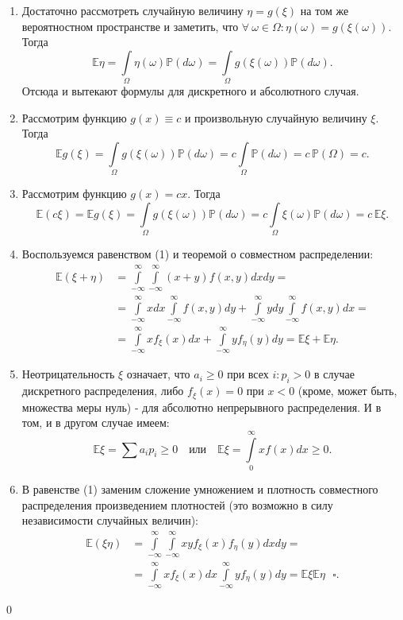 \documentclass[oneside,final,14pt]{extreport}
\newcommand\myprob[1]{{\mathbb{P}(#1)}}
\renewenvironment{proof}{{\bfseries Доказательство.}}{\qed}
\theoremstyle{plain}
\theoremstyle{definition}
\theoremstyle{named}
\begin{document}
\begin{proof}
\begin{enumerate}
    \item Достаточно рассмотреть случайную величину $\eta = g(\xi)$ на том же вероятностном пространстве и заметить, что $\forall \: \omega \in \Omega \colon \eta(\omega) = g(\xi(\omega))$. Тогда 
    $$ \mathbb{E}\eta = \int\limits_{\Omega} \eta(\omega) \mathbb{P}(d\omega) = \int\limits_{\Omega} g(\xi(\omega)) \mathbb{P}(d\omega). $$
    Отсюда и вытекают формулы для дискретного и абсолютного случая.
    
    \item Рассмотрим функцию $g(x) \equiv c$ и произвольную случайную величину $\xi$. Тогда 
    $$ \mathbb{E}g(\xi) = \int\limits_{\Omega}g(\xi(\omega))\mathbb{P}(d\omega) = 
    c \int\limits_{\Omega}\mathbb{P}(d\omega) = c \, \myprob{\Omega} = c.$$
    
    \item Рассмотрим функцию $g(x) = cx$. Тогда
    $$ \mathbb{E}(c\xi) = \mathbb{E}g(\xi) = \int\limits_{\Omega}g(\xi(\omega))\mathbb{P}(d\omega) = 
    c \int\limits_{\Omega}\xi(\omega)\mathbb{P}(d\omega) = 
    c \, \mathbb{E}\xi.$$
    
    \item Воспользуемся равенством (1) и теоремой о совместном распределении:
        $$\begin{aligned}
        \mathbb{E}(\xi+\eta) &=\int\limits_{-\infty}^{\infty} \int\limits_{-\infty}^{\infty}(x+y) f(x, y) d x d y=\\
        &=\int\limits_{-\infty}^{\infty} x d x \int\limits_{-\infty}^{\infty} f(x, y) d y+\int\limits_{-\infty}^{\infty} y d y \int\limits_{-\infty}^{\infty} f(x, y) d x=\\
        &=\int\limits_{-\infty}^{\infty} x f_{\xi}(x) d x+\int\limits_{-\infty}^{\infty} y f_{\eta}(y) d y=\mathbb{E} \xi+\mathbb{E} \eta.
        \end{aligned}$$
    \item Неотрицательность $\xi$ означает, что $a_i \geqslant 0$ при всех $i \colon p_i > 0$ в случае дискретного распределения, либо $f_\xi(x) = 0$ при $x < 0$ (кроме, может быть, множества меры нуль) - для абсолютно непрерывного распределения. И в том, и в другом случае имеем:
        $$\mathbb{E} \xi=\sum a_{i} p_{i} \geqslant 0 \quad \text {или} \quad \mathbb{E} \xi=\int\limits_{0}^{\infty} x f(x) d x \geqslant 0.$$
        
    \item В равенстве (1) заменим сложение умножением и плотность совместного распределения произведением плотностей (это возможно в силу независимости случайных величин):
        $$\begin{aligned}
        \mathbb{E}(\xi \eta) &=\int\limits_{-\infty}^{\infty} \int\limits_{-\infty}^{\infty} x y f_{\xi}(x) f_{\eta}(y) d x d y=\\
        &=\int\limits_{-\infty}^{\infty} x f_{\xi}(x) d x \int\limits_{-\infty}^{\infty} y f_{\eta}(y) d y=\mathbb{E} \xi \mathbb{E} \eta ~~~ \square.
        \end{aligned}$$
        

\end{enumerate}
\end{proof}
\end{document}
